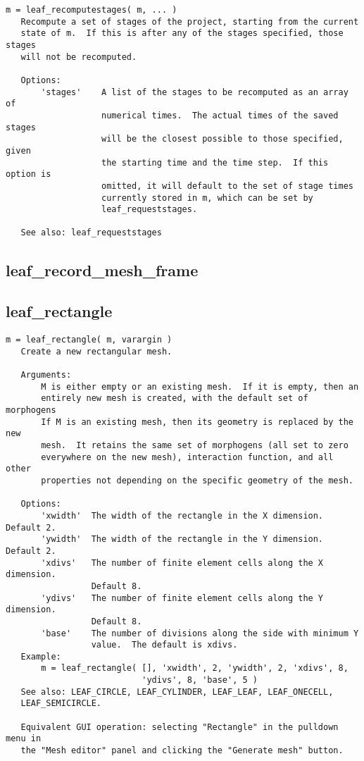 \begin{verbatim}
m = leaf_recomputestages( m, ... )
   Recompute a set of stages of the project, starting from the current
   state of m.  If this is after any of the stages specified, those stages
   will not be recomputed.

   Options:
       'stages'    A list of the stages to be recomputed as an array of
                   numerical times.  The actual times of the saved stages
                   will be the closest possible to those specified, given
                   the starting time and the time step.  If this option is
                   omitted, it will default to the set of stage times
                   currently stored in m, which can be set by
                   leaf_requeststages.

   See also: leaf_requeststages
\end{verbatim}

\subsection{leaf\_record\_mesh\_frame}\label{section-leaf-record-mesh-frame}

\subsection{leaf\_rectangle}\label{section-leaf-rectangle}

\begin{verbatim}
m = leaf_rectangle( m, varargin )
   Create a new rectangular mesh.

   Arguments:
       M is either empty or an existing mesh.  If it is empty, then an
       entirely new mesh is created, with the default set of morphogens
       If M is an existing mesh, then its geometry is replaced by the new
       mesh.  It retains the same set of morphogens (all set to zero
       everywhere on the new mesh), interaction function, and all other
       properties not depending on the specific geometry of the mesh.

   Options:
       'xwidth'  The width of the rectangle in the X dimension.  Default 2.
       'ywidth'  The width of the rectangle in the Y dimension.  Default 2.
       'xdivs'   The number of finite element cells along the X dimension.
                 Default 8.
       'ydivs'   The number of finite element cells along the Y dimension.
                 Default 8.
       'base'    The number of divisions along the side with minimum Y
                 value.  The default is xdivs.
   Example:
       m = leaf_rectangle( [], 'xwidth', 2, 'ywidth', 2, 'xdivs', 8,
                           'ydivs', 8, 'base', 5 )
   See also: LEAF_CIRCLE, LEAF_CYLINDER, LEAF_LEAF, LEAF_ONECELL,
   LEAF_SEMICIRCLE.

   Equivalent GUI operation: selecting "Rectangle" in the pulldown menu in
   the "Mesh editor" panel and clicking the "Generate mesh" button.
\end{verbatim}

